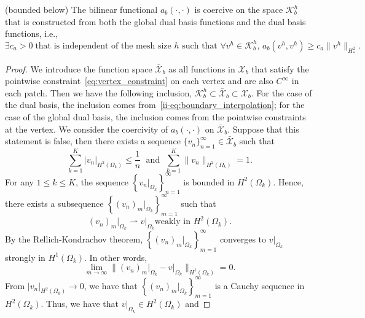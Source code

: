 \begin{lemma}\label{aspt:coercive}
  (bounded below) The bilinear functional $a_b(\cdot,\cdot)$ is coercive on the space $\mathcal{K}^h_b$ that is constructed from both the global dual basis functions and the \Bezier dual basis functions, i.e.,
  \begin{equation}
    \exists{c_a>0}\;\text{that is independent of the mesh size $h$ such that}\,\,\forall{v^h}\in\mathcal{K}_b^h,\, a_b(v^h,v^h)\geq{c_a\|{v^h}\|_{H^2_*}}.\label{eq:coercive}
  \end{equation}
  \begin{proof}
    We introduce the function space $\bar{\mathcal{X}}_b$ as all functions in $\mathcal{X}_b$ that satisfy the pointwise constraint~\eqref{eq:vertex_constraint} on each vertex and are also $C^\infty$ in each patch. Then we have the following inclusion, $\mathcal{K}^h_b\subset \bar{\mathcal{X}}_b \subset  \mathcal{X}_b$. For the case of the \Bezier dual basis, the inclusion comes from~\eqref{ii-eq:boundary_interpolation}; for the case of the global dual basis, the inclusion comes from the pointwise constraints at the vertex. We consider the coercivity of $a_b(\cdot,\cdot)$ on $\bar{\mathcal{X}}_b$. Suppose that this statement is false, then there exists a sequence $\{v_n\}_{n=1}^{\infty}\in \bar{\mathcal{X}}_b$ such that
    \begin{equation}
      \sum_{k=1}^K\vert v_n \vert_{H^2(\Omega_k)}\leq \frac{1}{n}\;\text{ and }\;\sum_{k=1}^K\| v_n \|_{H^2(\Omega_k)}=1.\label{eq:countrary}
    \end{equation}
    For any $1\leq k \leq K$, the sequence $\left\{ v_n\vert_{\Omega_k} \right\}_{n=1}^\infty$ is bounded in $H^2(\Omega_k)$. Hence, there exists a subsequence $\left\{ (v_n)_m\vert_{\Omega_k} \right\}_{m=1}^\infty$ such that
    \begin{equation}
      (v_n)_m\vert_{\Omega_k} \rightharpoonup v\vert_{\Omega_k} \text{weakly in } H^2(\Omega_k).
    \end{equation}
    By the Rellich-Kondrachov theorem, $\left\{ (v_n)_m\vert_{\Omega_k} \right\}_{m=1}^\infty$ converges to $v\vert_{\Omega_k}$ strongly in $H^1(\Omega_k)$. In other words,
    \begin{equation}
      \lim_{m\to\infty}\| (v_n)_m \vert_{\Omega_k} -v \vert_{\Omega_k}\|_{H^1(\Omega_k)}=0.
    \end{equation}
    From $\vert v_n \vert_{H^2(\Omega_k)}\rightarrow 0$, we have that $\left\{ (v_n)_m\vert_{\Omega_k} \right\}_{m=1}^\infty$ is a Cauchy sequence in $H^2(\Omega_k)$. Thus, we have that $v \vert_{\Omega_k}\in H^2(\Omega_k)$ and

\end{proof}
\end{lemma}
